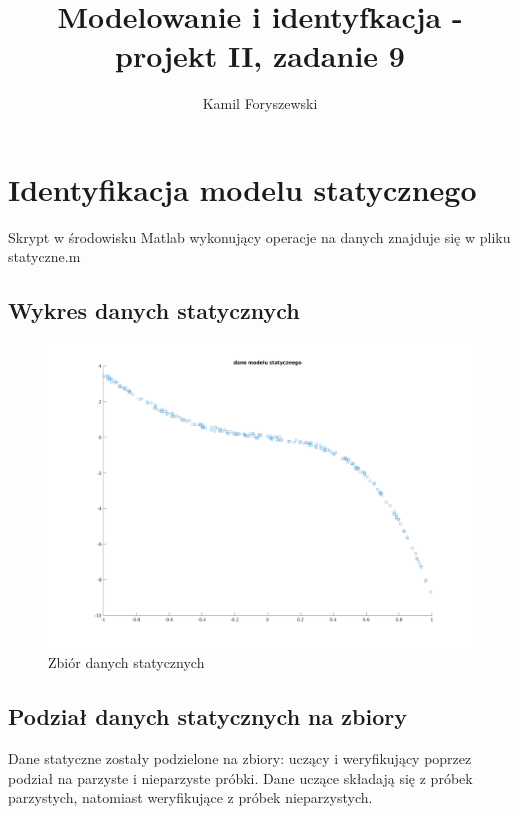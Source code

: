 \documentclass[a4paper, 11pt]{article}
\author{Kamil Foryszewski}
\title{Modelowanie i identyfkacja - projekt II, zadanie 9}
\begin{document}

\maketitle
\tableofcontents

\section{Identyfikacja modelu statycznego}
Skrypt w środowisku Matlab wykonujący operacje na danych znajduje się w pliku statyczne.m
\subsection{Wykres danych statycznych}
\begin{figure}[H]
\centering
\includegraphics[scale=0.5]{dane_stat.png}
\caption{Zbiór danych statycznych}
\label{}
\end{figure}

\subsection{Podział danych statycznych na zbiory}
Dane statyczne zostały podzielone na zbiory: uczący i weryfikujący poprzez podział na parzyste i nieparzyste próbki. Dane uczące składają się z próbek parzystych, natomiast weryfikujące z próbek nieparzystych. 
\end{document}
